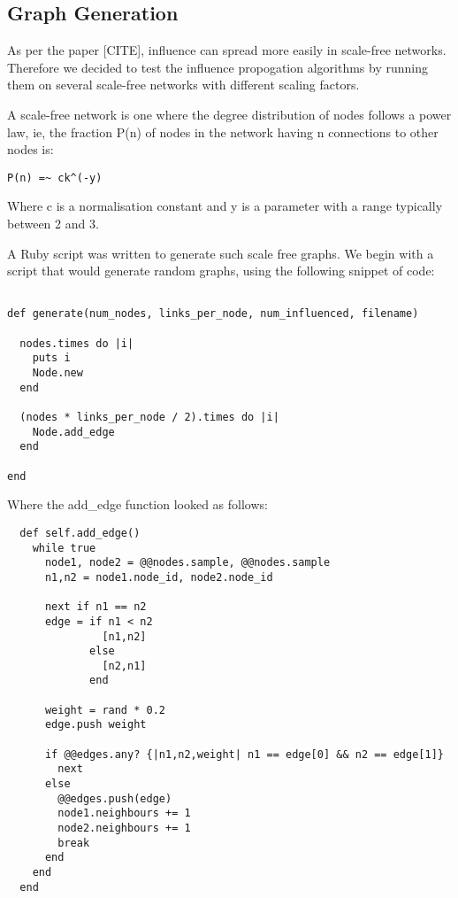 \subsection{Graph Generation}

As per the paper [CITE], influence can spread more easily in scale-free networks. Therefore we decided to test the influence propogation algorithms by running them on several scale-free networks with different scaling factors.

A scale-free network is one where the degree distribution of nodes follows a power law, ie, the fraction P(n) of nodes in the network having n connections to other nodes is:

\begin{verbatim}
P(n) =~ ck^(-y)
\end{verbatim}

Where c is a normalisation constant and y is a parameter with a range typically between 2 and 3.

A Ruby script was written to generate such scale free graphs. We begin with a script that would generate random graphs, using the following snippet of code:

\begin{verbatim}

def generate(num_nodes, links_per_node, num_influenced, filename)

  nodes.times do |i|
    puts i
    Node.new
  end

  (nodes * links_per_node / 2).times do |i|
    Node.add_edge
  end

end
\end{verbatim}

Where the add\_edge function looked as follows:

\begin{verbatim}
  def self.add_edge()
    while true
      node1, node2 = @@nodes.sample, @@nodes.sample
      n1,n2 = node1.node_id, node2.node_id

      next if n1 == n2
      edge = if n1 < n2
               [n1,n2]
             else
               [n2,n1]
             end

      weight = rand * 0.2
      edge.push weight

      if @@edges.any? {|n1,n2,weight| n1 == edge[0] && n2 == edge[1]}
        next
      else
        @@edges.push(edge)
        node1.neighbours += 1
        node2.neighbours += 1
        break
      end
    end
  end

\end{verbatim}

